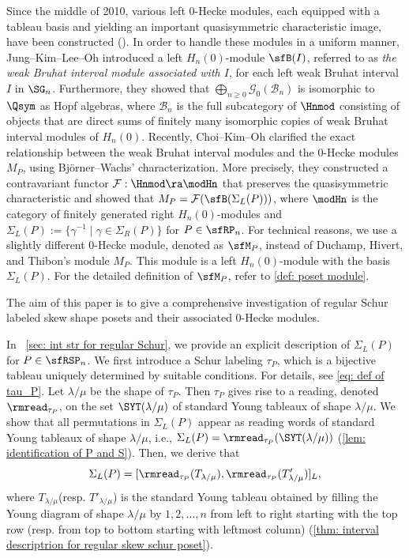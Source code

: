 \documentclass[12pt, reqno]{amsart}
\theoremstyle{definition}
\numberwithin{equation}{section} \numberwithin{figure}{section}
\numberwithin{table}{section}
\begin{document}
Since the middle of 2010, various  left $0$-Hecke modules, each equipped with a tableau basis and yielding an important quasisymmetric characteristic image, have been constructed (\cite{20BS, 15BBSSZ, 19Searles, 15TW, 19TW}).
In order to handle these modules in a uniform manner, Jung--Kim--Lee--Oh \cite{22JKLO} introduced a left $H_n(0)$-module $\sfB(I)$, referred to as \emph{the weak Bruhat interval module associated with $I$}, for each left weak Bruhat interval $I$ in $\SG_n$.
Furthermore, they showed that $\bigoplus_{n \ge 0} \mathcal{G}_0(\mathscr{B}_n)$ is isomorphic to $\Qsym$ as Hopf algebras, where $\mathscr{B}_n$ is the full subcategory of $\Hnmod$ consisting of objects that are direct sums of finitely many isomorphic copies of weak Bruhat interval modules of $H_n(0)$.
Recently, Choi--Kim--Oh \cite{23CKO} clarified the exact relationship between the weak Bruhat interval modules and the $0$-Hecke modules $M_P$, using Bj\"{o}rner--Wachs' characterization.
More precisely, they constructed a contravariant functor $\mathcal{F}:\Hnmod \ra \modHn$ that preserves the quasisymmetric characteristic and showed that $M_P = \mathcal{F}(\sfB(\Sigma_L(P)))$, where $\modHn$ is the category of finitely generated right $H_n(0)$-modules and $\Sigma_L(P) := \{\gamma^{-1} \mid \gamma \in \Sigma_R(P)\}$ for $P \in \sfRP_n$.
For technical reasons, we use a slightly different $0$-Hecke module, denoted as $\sfM_P$, instead of Duchamp, Hivert, and Thibon's module $M_P$. This module is a left $H_n(0)$-module with the basis $\Sigma_L(P)$.
For the detailed definition of $\sfM_P$, refer to \cref{def: poset module}.

The aim of this paper is to give a comprehensive investigation of regular Schur labeled skew shape posets and their associated $0$-Hecke modules. 



In ~\cref{sec: int str for regular Schur}, we provide an explicit description of  $\Sigma_L(P)$ for $P \in \sfRSP_n$.  
We first introduce a Schur labeling $\tau_P$, which is a bijective tableau uniquely determined by suitable conditions.
For details, see \cref{eq: def of tau_P}.  
Let $\lambda/\mu$ be the shape of $\tau_P$.
Then $\tau_P$ gives rise to a reading, denoted $\rmread_{\tau_P}$, on 
the set $\SYT(\lambda/\mu)$ of standard Young tableaux of shape $\lambda/\mu$.
We show that all permutations in $\Sigma_L(P)$ appear  
as reading words of standard Young tableaux of shape $\lambda/\mu$, i.e.,  
$
\Sigma_L(P) = \rmread_{\tau_P}(\SYT(\lambda/\mu))
$
(\cref{lem: identification of P and S}).
Then, we derive that 
\[
\Sigma_L(P) = [\rmread_{\tau_P}(T_{\lambda/\mu}), \rmread_{\tau_P}(T'_{\lambda/\mu})]_L,\]
where $T_{\lambda/\mu}$(resp. $T'_{\lambda/\mu}$) is the standard Young tableau obtained by filling the Young diagram of shape $\lambda/\mu$ 
by $1, 2, \ldots, n$ from left to right starting with the top row (resp. from top to bottom starting with leftmost column)
(\cref{thm: interval descriptrion for regular skew schur poset}).
\end{document}
